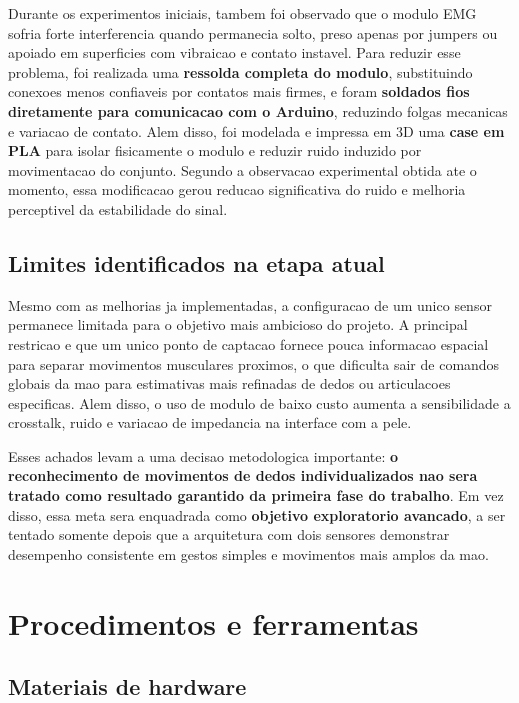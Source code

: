 \documentclass[12pt,oneside,a4paper,brazilian]{abntex2}
\begin{document}
Durante os experimentos iniciais, tambem foi observado que o modulo EMG sofria forte interferencia quando permanecia solto, preso apenas por jumpers ou apoiado em superficies com vibraicao e contato instavel. Para reduzir esse problema, foi realizada uma \textbf{ressolda completa do modulo}, substituindo conexoes menos confiaveis por contatos mais firmes, e foram \textbf{soldados fios diretamente para comunicacao com o Arduino}, reduzindo folgas mecanicas e variacao de contato. Alem disso, foi modelada e impressa em 3D uma \textbf{case em PLA} para isolar fisicamente o modulo e reduzir ruido induzido por movimentacao do conjunto. Segundo a observacao experimental obtida ate o momento, essa modificacao gerou reducao significativa do ruido e melhoria perceptivel da estabilidade do sinal.

\subsection{Limites identificados na etapa atual}

Mesmo com as melhorias ja implementadas, a configuracao de um unico sensor permanece limitada para o objetivo mais ambicioso do projeto. A principal restricao e que um unico ponto de captacao fornece pouca informacao espacial para separar movimentos musculares proximos, o que dificulta sair de comandos globais da mao para estimativas mais refinadas de dedos ou articulacoes especificas. Alem disso, o uso de modulo de baixo custo aumenta a sensibilidade a crosstalk, ruido e variacao de impedancia na interface com a pele.

Esses achados levam a uma decisao metodologica importante: \textbf{o reconhecimento de movimentos de dedos individualizados nao sera tratado como resultado garantido da primeira fase do trabalho}. Em vez disso, essa meta sera enquadrada como \textbf{objetivo exploratorio avancado}, a ser tentado somente depois que a arquitetura com dois sensores demonstrar desempenho consistente em gestos simples e movimentos mais amplos da mao.

\section{Procedimentos e ferramentas}

\subsection{Materiais de hardware}
\end{document}
